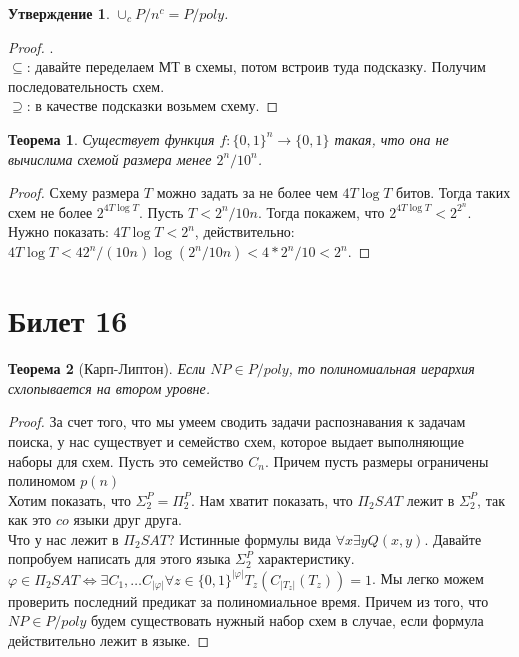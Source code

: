 \documentclass[12pt, letterpaper]{article}
\newtheorem{theorem}{Теорема}[section]
\newtheorem{prop}{Утверждение}[section]
\newcommand{\ph}{\varphi}
\begin{document}
\begin{prop}
$\cup_{c} P / n^c = P / poly$.
\end{prop}
\begin{proof}.\\
$\subseteq$: давайте переделаем МТ в схемы, потом встроив туда подсказку. Получим последовательность схем. \\
$\supseteq$: в качестве подсказки возьмем схему.
\end{proof}
          
\begin{theorem} Существует функция $f : \{0, 1\}^n \rightarrow \{0, 1\}$ такая, что она не вычислима схемой размера менее $2^n / 10^n$.
\end{theorem}

\begin{proof}
Схему размера $T$ можно задать за не более чем $4T \log T$ битов. Тогда таких схем не более $2^{4 T \log T}$. Пусть $T < 2^n / 10n$. Тогда покажем, что $2^{4 T \log T} < 2^{2^n}$. Нужно показать: $4 T \log T < 2^n$, действительно: $4 T \log T < 4 2^n/(10n) \log(2^n/10n) < 4 * 2^n / 10 < 2^n$. 
\end{proof}

\section{Билет 16}
\begin{theorem}[Карп-Липтон]
Если $NP \in P/poly$, то полиномиальная иерархия схлопывается на втором уровне.
\end{theorem}
\begin{proof}
За счет того, что мы умеем сводить задачи распознавания к задачам поиска, у нас существует и семейство схем, которое выдает выполняющие наборы для схем. Пусть это семейство $C_n$. Причем пусть размеры ограничены полиномом $p(n)$\\
Хотим показать, что $\Sigma^P_2 = \Pi^P_2$. Нам хватит показать, что $\Pi_2 SAT$ лежит в $\Sigma^P_2$, так как это $co$ языки друг друга.\\
Что у нас лежит в $\Pi_2 SAT$? Истинные формулы вида $\forall x \exists y Q(x, y)$. Давайте попробуем написать для этого языка $\Sigma^P_2$ характеристику.\\
$\ph \in \Pi_2 SAT \Longleftrightarrow \exists C_1, \ldots C_{|\ph|} \forall z \in \{0,1\}^{|\ph|} T_{z} (C_{|T_{z}|} (T_z)) = 1 $. Мы легко можем проверить последний предикат за полиномиальное время. Причем из того, что $NP \in P/poly$ будем существовать нужный набор схем в случае, если формула действительно лежит в языке.
\end{proof}
\end{document}

